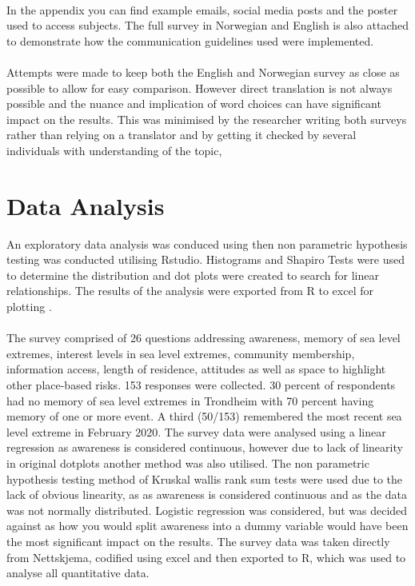\paragraph{}
In the appendix you can find example emails, social media posts and the poster used to access subjects. The full survey in Norwegian and English is also attached to demonstrate how the communication guidelines used were implemented.
\paragraph{}

Attempts were made to keep both the English and Norwegian survey as close as possible to allow for easy comparison. However direct translation is not always possible and the nuance and implication of word choices can have significant impact on the results. This was minimised by the researcher writing both surveys rather than relying on a translator and by getting it checked by several individuals with understanding of the topic,



\section{Data Analysis}
An exploratory data analysis was conduced using then non parametric hypothesis testing was conducted utilising Rstudio. Histograms and Shapiro Tests were used to determine the distribution and dot plots were created to search for linear relationships. The results of the analysis were exported from R to excel for plotting .
\paragraph{}
  The survey comprised of 26 questions addressing awareness, memory of sea level extremes, interest levels in sea level extremes, community membership, information access, length of residence, attitudes as well as space to highlight other place-based risks. 153 responses were collected. 30 percent of respondents had no memory of sea level extremes in Trondheim with 70 percent having memory of one or more event. A third (50/153) remembered the most recent sea level extreme in February 2020. The survey data were analysed using a linear regression as awareness is considered continuous, however due to lack of linearity in original dotplots another method was also utilised. The non parametric hypothesis testing method of Kruskal wallis rank sum tests were used due to the lack of obvious linearity, as as awareness is considered continuous and as the data was not normally distributed. Logistic regression was considered, but was decided against as how you would split awareness into a dummy variable would have been the most significant impact on the results. The survey data was taken directly from Nettskjema, codified using excel and then exported to R, which was used to analyse all quantitative data. 
